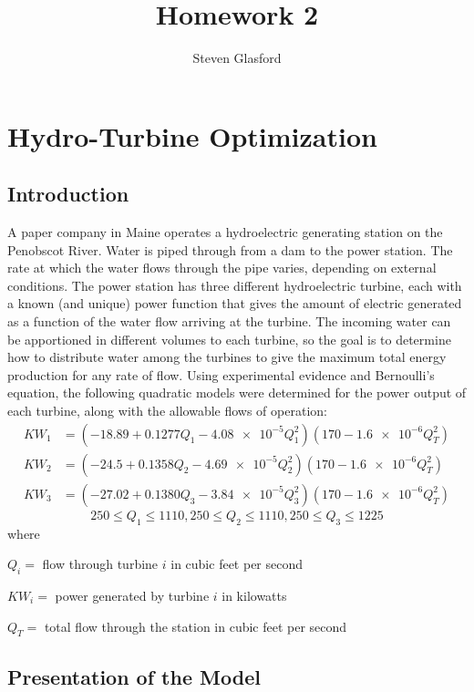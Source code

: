 \documentclass{report}
\title{Homework 2}
\author{Steven Glasford}
\date{\parbox{\linewidth}{\centering%
    \today\endgraf\medskip
    Math-451-M001}}
\begin{document}
\maketitle
\tableofcontents

\chapter{Hydro-Turbine Optimization}
\section{Introduction}
A paper company in Maine operates a hydroelectric generating station on the Penobscot River. Water is piped through from a dam to the power station. The rate at which the water flows through the pipe varies, depending on external conditions. The power station has three different hydroelectric turbine, each with a known (and unique) power function that gives the amount of electric generated as a function of the water flow arriving at the turbine. The incoming water can be apportioned in different volumes to each turbine, so the goal is to determine how to distribute water among the turbines to give the maximum total energy production for any rate of flow. Using experimental evidence and Bernoulli's equation, the following quadratic models were determined for the power output of each turbine, along with the allowable flows of operation:
\begin{align*}
    KW_1 &= (-18.89+0.1277Q_1-\num{4.08e-5}Q_1^2)(170-\num{1.6e-6}Q_T^2)\\
    KW_2 &= (-24.5+0.1358Q_2-\num{4.69e-5}Q_2^2)(170-\num{1.6e-6}Q_T^2)\\
    KW_3 &= (-27.02+0.1380Q_3-\num{3.84e-5}Q_3^2)(170-\num{1.6e-6}Q_T^2)
\end{align*}
$$250 \leq Q_1 \leq 1110, 250 \leq Q_2 \leq 1110, 250 \leq Q_3 \leq 1225$$
where

$Q_i = $ flow through turbine $i$ in cubic feet per second

$KW_i = $ power generated by turbine $i$ in kilowatts

$Q_T = $ total flow through the station in cubic feet per second


\section{Presentation of the Model}
\end{document}
